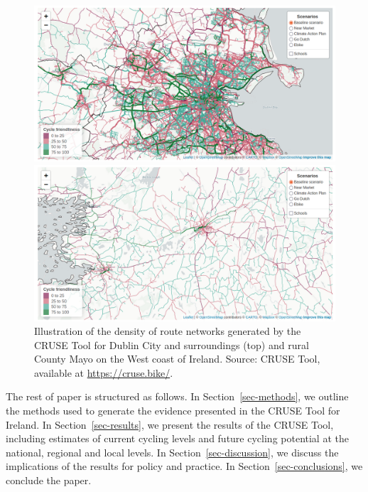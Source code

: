 \documentclass[
  super,
  preprint,
  3p]{elsarticle}
\begin{document}
\begin{figure}

{\centering 

\includegraphics{images/paste-1.png}

\includegraphics{images/paste-3.png}

}

\caption{\label{fig-dublin}Illustration of the density of route networks
generated by the CRUSE Tool for Dublin City and surroundings (top) and
rural County Mayo on the West coast of Ireland. Source: CRUSE Tool,
available at \url{https://cruse.bike/}.}

\end{figure}

The rest of paper is structured as follows. In
Section~\ref{sec-methods}, we outline the methods used to generate the
evidence presented in the CRUSE Tool for Ireland. In
Section~\ref{sec-results}, we present the results of the CRUSE Tool,
including estimates of current cycling levels and future cycling
potential at the national, regional and local levels. In
Section~\ref{sec-discussion}, we discuss the implications of the results
for policy and practice. In Section~\ref{sec-conclusions}, we conclude
the paper.
\end{document}
